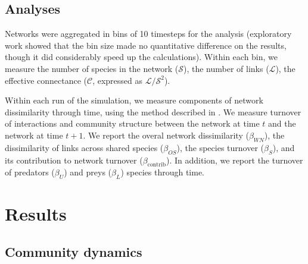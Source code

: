 \documentclass[10pt,twocolumn,fleqn]{article}
\begin{document}
\subsection{Analyses}

Networks were aggregated in bins of 10 timesteps for the analysis
(exploratory work showed that the bin size made no quantitative difference on
the results, though it did considerably speed up the calculations). Within
each bin, we measure the number of species in the network ($\mathcal{S}$), the
number of links ($\mathcal{L}$), the effective connectance ($\mathcal{C}$, expressed as
$\mathcal{L}/\mathcal{S}^2$).

Within each run of the simulation, we measure components of network
dissimilarity through time, using the method described in
\citet{poisot_dissimilarity_2012}. We measure turnover of interactions and
community structure between the network at time $t$ and the network at time
$t+1$. We report the overal network dissimilarity ($\beta_{WN}$), the
dissimilarity of links across shared species ($\beta_{OS}$), the species
turnover ($\beta_{S}$), and its contribution to network turnover
($\beta_{\mathrm{contrib}}$). In addition, we report the turnover of predators
($\beta_{U}$) and preys ($\beta_{L}$) species through time.

\section{Results}

\subsection{Community dynamics}
\end{document}
